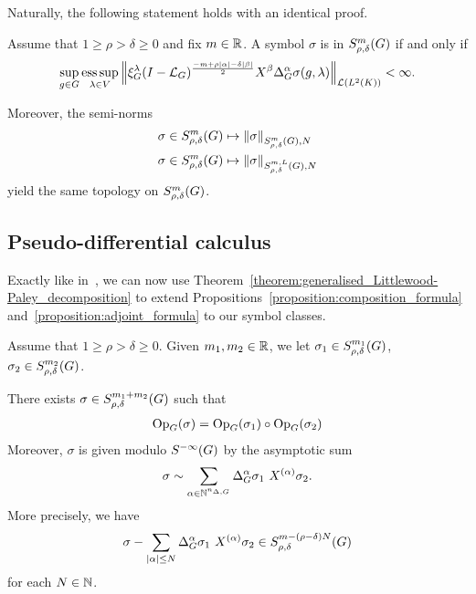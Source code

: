 Naturally,
the following statement holds with an identical proof.

\begin{theorem}
    Assume that $1 \geq \rho > \delta \geq 0$ and fix $m \in \mathbb{R}$.
    A symbol $\sigma$ is in $S^{m}_{\rho, \delta}(G)$ if and only if
    \begin{align*}
        \sup_{g \in \Group} \esssup_{\lambda \in \VectorSpace}
        \norm [\Lin {\Lebesgue 2 \CompactGroup}] {%
            \Rep \lambda \BesselPotential {-m + \rho \abs \alpha - \delta \abs \beta}
            \LeftDifferentialOperator \beta
            \DifferenceOperatorOrder \alpha
            \sigma(g, \lambda)
        } < \infty.
    \end{align*}

    Moreover,
    the semi-norms
    \begin{align*}
        &\sigma \in S^{m}_{\rho, \delta}(G) \mapsto {\left\| \sigma \right\|}_{S^{m}_{\rho, \delta}(G), N}\\
        &\sigma \in S^{m}_{\rho, \delta}(G) \mapsto {\left\| \sigma \right\|}_{S^{m, L}_{\rho, \delta}(G), N}
    \end{align*}
    yield the same topology on $S^{m}_{\rho, \delta}(G)$.
\end{theorem}

\subsection{Pseudo-differential calculus}

Exactly like in~\cite{FischerRuzhansky16},
we can now use Theorem~\ref{theorem:generalised_Littlewood-Paley_decomposition} to extend
Propositions~\ref{proposition:composition_formula} and~\ref{proposition:adjoint_formula}
to our symbol classes.

\begin{theorem}
\label{theorem:composition_formula}
    Assume that $1 \geq \rho > \delta \geq 0$.
    Given $m_1, m_2 \in \mathbb{R}$,
    we let
    $\sigma_1 \in S^{m_1}_{\rho, \delta}(G)$,
    $\sigma_2 \in S^{m_2}_{\rho, \delta}(G)$.

    There exists $\sigma \in S^{m_1 + m_2}_{\rho, \delta}(G)$ such that
    \begin{align*}
        \mathrm{Op}_{G} (\sigma) = \mathrm{Op}_{G}(\sigma_1) \circ \mathrm{Op}_{G}(\sigma_2)
    \end{align*}
    Moreover,
    $\sigma$ is given modulo ${S^{-\infty} (G)}$ by the asymptotic sum
    \begin{align*}
        \sigma \sim
        \sum_{\alpha \in \mathbb{N}^{n_{\Delta, G}}} {\Delta_{G}^{\alpha}} \sigma_1 \ X^{(\alpha)} \sigma_2.
    \end{align*}
    More precisely,
    we have
    \begin{align*}
        \sigma
        - \sum_{\left|{\alpha}\right| \leq N} {\Delta_{G}^{\alpha}} \sigma_1 \ X^{(\alpha)} \sigma_2 \in S^{m - (\rho - \delta) N}_{\rho, \delta}(G)
    \end{align*}
    for each $N \in \mathbb{N}$.
\end{theorem}

